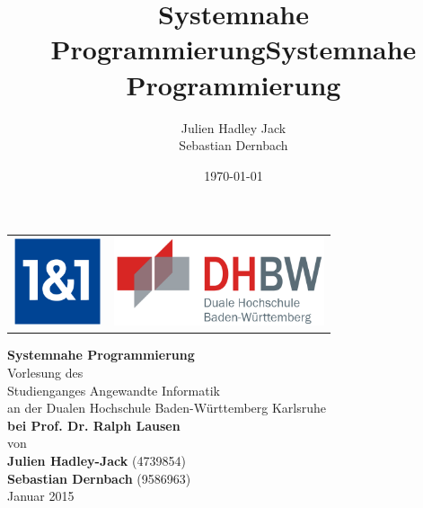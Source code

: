 \documentclass[
    pagesize=pdftex,    %
    twoside=false,      %
    fontsize=12pt,      %
    parskip=half,       %
    headsepline,        %
    footsepline,        %
    abstract=false,     %
    listof=totoc,       %
    toc=bibliography,   %
]{scrreprt}
\title{Systemnahe Programmierung}
\author{}
\date{\today}
\begin{document}



\title{Systemnahe Programmierung}



\author{
        Julien Hadley Jack \\
        Sebastian Dernbach \\
       }


\begin{titlepage}
	\begin{longtable}{p{} p{}}
	  {\includegraphics[height=2.6cm]{images/1und1-logo}} & 
	  {\includegraphics[height=2.6cm]{images/dhbw.png}}
	\end{longtable}
	\enlargethispage{20mm}
	\begin{center}
	  \vspace*{12mm}	{\LARGE\bf Systemnahe Programmierung}\\
      \vspace*{12mm}    Vorlesung des\\
	  \vspace*{3mm}	Studienganges Angewandte Informatik\\
	  \vspace*{3mm} 	an der Dualen Hochschule Baden-Württemberg Karlsruhe\\
	  \vspace*{12mm}	{\large\bf bei Prof. Dr. Ralph Lausen}\\
	  \vspace*{12mm}	von\\
	  \vspace*{3mm} 	{\large\bf Julien Hadley-Jack} (4739854)\\{\large\bf Sebastian Dernbach} (9586963)\\
	  \vspace*{12mm}	Januar 2015\\
	\end{center}
	\vfill
\end{titlepage}
\end{document}
